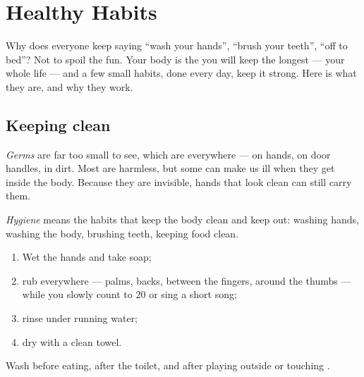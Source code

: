 \chapter{Healthy Habits}\label{ch:g1:healthy-habits}

Why does everyone keep saying ``wash your hands'', ``brush your
teeth'', ``off to bed''? Not to spoil the fun. Your body is the
 you will keep the longest --- your whole life --- and
a few small habits, done every day, keep it strong. Here is what
they are, and why they work.

\section{Keeping clean}

\begin{definition}[Germs]\label{def:g1:healthy-habits:germs}
\emph{Germs} are  far too small to see,
which are everywhere --- on hands, on door handles, in dirt. Most
are harmless, but some can make us ill when they get inside the
body. Because they are invisible, hands that look clean can still
carry them.
\end{definition}

\begin{definition}[Hygiene]\label{def:g1:healthy-habits:hygiene}
\emph{Hygiene} means the habits that keep the body
clean and keep  out: washing hands, washing the body, brushing
teeth, keeping food clean.
\end{definition}

\begin{method}\label{met:g1:healthy-habits:hands}
\begin{enumerate}
  \item Wet the hands and take soap;
  \item rub everywhere --- palms, backs, between the fingers,
        around the thumbs --- while you slowly count to $20$ or
        sing a short song;
  \item rinse under running water;
  \item dry with a clean towel.
\end{enumerate}
Wash before eating, after the toilet, and after playing outside or
touching .
\end{method}

